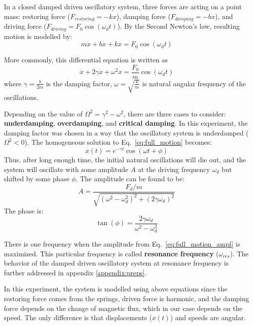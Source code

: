 In a closed damped driven oscillatory system, three forces are acting on a point mass: restoring force ($F_{restoring} = -kx$), damping force ($F_{damping} = -b\dot{x}$), and driving force ($F_{driving} = F_0 \cos(\omega_d t)$). By the Second Newton's law, resulting motion is modelled by:
\begin{equation*}
    m\ddot{x} + b\dot{x} + kx = F_0 \cos(\omega_d t)
\end{equation*}

More commonly, this differential equation is written as
\begin{equation} \label{eq:full_motion}
    \ddot{x} + 2\gamma \dot{x} + \omega^2 x = \frac{F_0}{m} \cos(\omega_d t)
\end{equation} where $\gamma = \frac{b}{2m}$ is the damping factor, $\omega = \sqrt{\frac{k}{m}}$ is natural angular frequency of the oscillations.

Depending on the value of $\Omega^2 = \gamma^2 - \omega^2$, there are three cases to consider: \textbf{underdamping}, \textbf{overdamping}, and \textbf{critical damping}. In this experiment, the damping factor was chosen in a way that the oscillatory system is underdamped ($\Omega^2 < 0$). The homogeneous solution to  Eq.~\eqref{eq:full_motion} becomes:
\begin{equation} \label{eq:underdamped_solution}
  x(t) = e^{-\gamma t} \cos(\omega t + \phi)
\end{equation}
Thus, after long enough time, the initial natural oscillations will die out, and the system will oscillate with some amplitude $A$ at the driving frequency $\omega_d$ but shifted by some phase $\phi$.
The amplitude can be found to be:
\begin{equation} \label{eq:full_motion_ampl}
  A = \frac{ F_d/m  }{ \sqrt{ (\omega^2 - \omega_d^2)^2 + (2\gamma \omega_d)^2 } }
\end{equation}
The phase is:
\begin{equation} \label{eq:full_motion_phase}
  \tan(\phi) = \frac{2 \gamma \omega_d}{\omega^2 - \omega_d^2}
\end{equation}

There is one frequency when the amplitude from Eq.~\eqref{eq:full_motion_ampl} is maximized. This particular frequency is called \textbf{resonance frequency} ($\omega_{res}$). The behavior of the damped driven oscillatory system at resonance frequency is further addressed in appendix \ref{appendix:preps}.  

In this experiment, the system is modelled using above equations since the restoring force comes from the springs, driven force is harmonic, and the damping force depends on the change of magnetic flux, which in our case depends on the speed. The only difference is that displacements ($x(t)$) and speeds are angular.  
